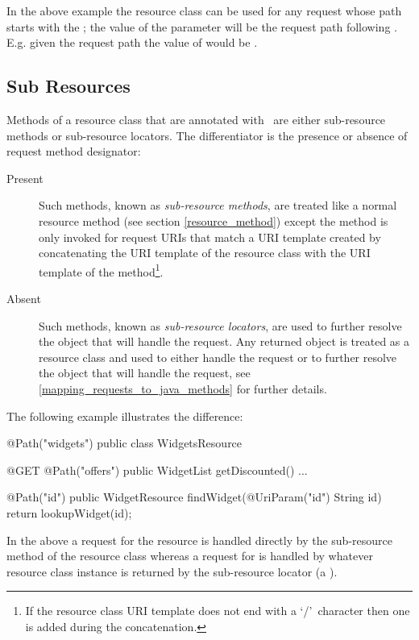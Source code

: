 In the above example the  resource class can be used for any request whose path starts with the ; the value of the  parameter will be the request path following . E.g. given the request path  the value of  would be .

\subsection{Sub Resources}
\label{sub_resources}

Methods of a resource class that are annotated with \Path\ are either sub-resource methods or sub-resource locators. The differentiator is the presence or absence of request method designator:

\begin{description}
\item[Present] Such methods, known as {\em sub-resource methods}, are treated like a normal resource method (see section \ref{resource_method}) except the method is only invoked for request URIs that match a URI template created by concatenating the URI template of the resource class with the URI template of the method\footnote{If the resource class URI template does not end with a \lq/\rq\ character then one is added during the concatenation.}.
\item[Absent] Such methods, known as {\em sub-resource locators}, are used to further resolve the object that will handle the request. Any returned object is treated as a resource class and used to either handle the request or to further resolve the object that will handle the request, see \ref{mapping_requests_to_java_methods} for further details.
\end{description}

The following example illustrates the difference:

\begin{listing}{1}
@Path("widgets")
public class WidgetsResource {
  @GET
  @Path("offers")
  public WidgetList getDiscounted() {...}
  
  @Path("{id}")
  public WidgetResource findWidget(@UriParam("id") String id) {
    return lookupWidget(id);
  }
}\end{listing}

In the above a  request for the  resource is handled directly by the  sub-resource method of the resource class  whereas a  request for  is handled by whatever resource class instance is returned by the  sub-resource locator (a ).

